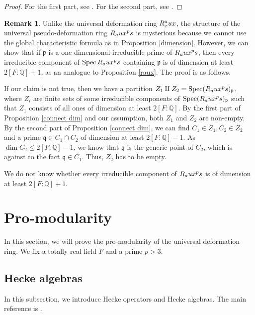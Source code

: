 \documentclass[12pt]{amsart}
\theoremstyle{plain}
\theoremstyle{definition}
\newtheorem{rem}[thm]{Remark}
\theoremstyle{remark}
\begin{document}
\begin{proof}
	For the first part, see \cite[Lemma 7.1.2]{pan2022fontaine}.
	For the second part, see \cite[Lemma 7.4.6]{pan2022fontaine}.
\end{proof}

\begin{rem}
	Unlike the universal deformation ring $R_x^\textnormal{aux} $, the structure of the universal pseudo-deformation ring $R_\textnormal{aux}^\textnormal{ps} $ is mysterious because we cannot use the global characteristic formula as in Proposition \ref{dimension}. However, we can show that if $\mathfrak{p}$ is a one-dimensional irreducible prime of $R_\textnormal{aux}^\textnormal{ps} $, then every irreducible component of $\operatorname{Spec} R_\textnormal{aux}^\textnormal{ps}$ containing $\mathfrak{p}$ is of dimension at least $ 2[F: \mathbb{Q}]+1$, as an analogue to Proposition \ref{raux}. The proof is as follows.
	
	If our claim is not true, then we have a partition $Z_1\amalg Z_2=\operatorname{Spec} (R_\textnormal{aux}^\textnormal{ps})_\mathfrak{p}$, where $Z_i$ are finite sets of some irreducible components of $ \operatorname{Spec} (R_\textnormal{aux}^\textnormal{ps})_\mathfrak{p}$ such that $Z_1$ consists of all ones of dimension at least $ 2[F: \mathbb{Q}]$. By the first part of Proposition \ref{connect dim} and our assumption, both $Z_1$ and $Z_2$ are non-empty. By the second part of Proposition \ref{connect dim}, we can find $C_1 \in Z_1, C_2 \in Z_2$ and a prime $\mathfrak{q} \in C_1 \cap C_2$ of dimension at least $2[F: \mathbb{Q}]-1$. As $\operatorname{dim} C_2 \le 2[F: \mathbb{Q}]-1$, we know that $\mathfrak{q}$ is the generic point of $C_2$, which is against to the fact $\mathfrak{q} \in C_1$. Thus, $Z_2$ has to be empty.
	
	We do not know whether every irreducible component of $R_\textnormal{aux}^\textnormal{ps} $ is of dimension at least $ 2[F: \mathbb{Q}]+1$.
\end{rem}

\section{Pro-modularity}
In this section, we will prove the pro-modularity of the universal deformation ring. We fix a totally real field $F$ and a prime $p > 3$.

\subsection{Hecke algebras}
In this subsection, we introduce Hecke operators and Hecke algebras. The main reference is \cite[Section 3]{pan2022fontaine}.
\end{document}
